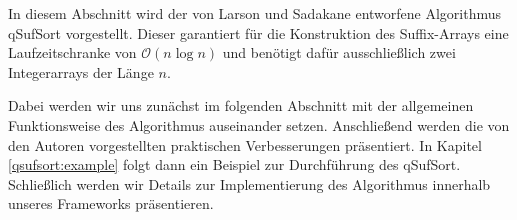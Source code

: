 \newtheorem{lemma}{Lemma}
In diesem Abschnitt wird der von Larson und Sadakane entworfene Algorithmus qSufSort \cite{saca:1} vorgestellt. 
Dieser garantiert für die Konstruktion des Suffix-Arrays eine Laufzeitschranke von $\mathcal{O}(n\log n)$ und benötigt dafür ausschließlich zwei Integerarrays der Länge $n$.

Dabei werden wir uns zunächst im folgenden Abschnitt mit der allgemeinen Funktionsweise des Algorithmus auseinander setzen. Anschließend werden die von den Autoren vorgestellten praktischen Verbesserungen präsentiert. In Kapitel \ref{qsufsort:example} folgt dann ein Beispiel zur Durchführung des qSufSort. Schließlich werden wir Details zur Implementierung des Algorithmus innerhalb unseres Frameworks präsentieren.
